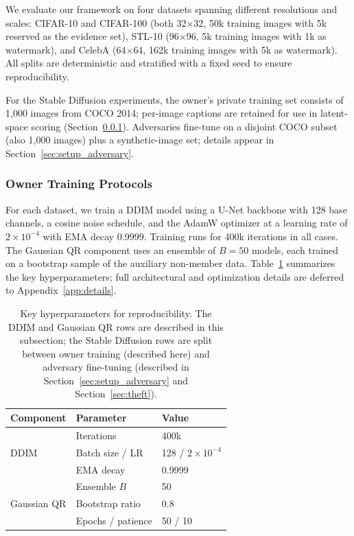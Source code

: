 \documentclass{article}
\begin{document}
We evaluate our framework on four datasets spanning different resolutions and scales: CIFAR-10 and CIFAR-100 (both 32$\times$32, 50k training images with 5k reserved as the evidence set), STL-10 (96$\times$96, 5k training images with 1k as watermark), and CelebA (64$\times$64, 162k training images with 5k as watermark). All splits are deterministic and stratified with a fixed seed to ensure reproducibility.

For the Stable Diffusion experiments, the owner's private training set consists of 1{,}000 images from COCO 2014; per-image captions are retained for use in latent-space scoring (Section~\ref{sec:setup_training}). Adversaries fine-tune on a disjoint COCO subset (also 1{,}000 images) plus a synthetic-image set; details appear in Section~\ref{sec:setup_adversary}.

\subsubsection{Owner Training Protocols}
\label{sec:setup_training}

For each dataset, we train a DDIM model using a U-Net backbone with 128 base channels, a cosine noise schedule, and the AdamW optimizer at a learning rate of $2\times10^{-4}$ with EMA decay 0.9999. Training runs for 400k iterations in all cases. The Gaussian QR component uses an ensemble of $B{=}50$ models, each trained on a bootstrap sample of the auxiliary non-member data. Table~\ref{tab:hyperparams} summarizes the key hyperparameters; full architectural and optimization details are deferred to Appendix~\ref{app:details}.

\begin{table}[t]
\caption{Key hyperparameters for reproducibility. The DDIM and Gaussian QR rows are described in this subsection; the Stable Diffusion rows are split between owner training (described here) and adversary fine-tuning (described in Section~\ref{sec:setup_adversary} and Section~\ref{sec:theft}).}
\label{tab:hyperparams}
\centering
\begin{small}
\begin{tabular}{@{}lll@{}}
\toprule
Component & Parameter & Value \\
\midrule
\multirow{3}{*}{DDIM} & Iterations & 400k \\
& Batch size / LR & 128 / $2{\times}10^{-4}$ \\
& EMA decay & 0.9999 \\
\midrule
\multirow{3}{*}{Gaussian QR} & Ensemble $B$ & 50 \\
& Bootstrap ratio & 0.8 \\
& Epochs / patience & 50 / 10 \\
\bottomrule
\end{tabular}
\end{small}
\end{table}
\end{document}
